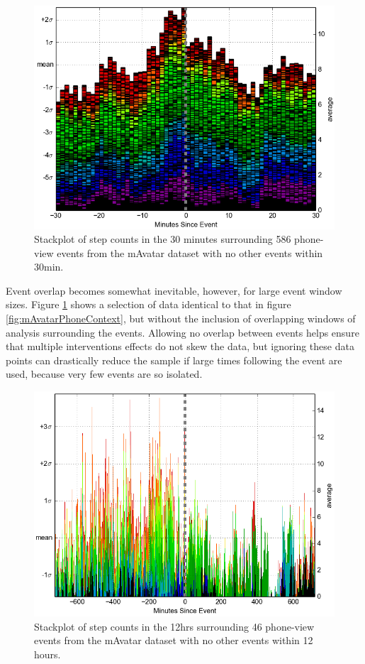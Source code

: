 \begin{figure}
\centering
\includegraphics[width=0.9\columnwidth]{./img/mAvatarViews_586_noOverlap.png}
\caption{Stackplot of step counts in the 30 minutes surrounding 586 phone-view events from the mAvatar dataset with no other events within 30min.}
\label{fig:mAvatarNoOverlap}
\end{figure}

Event overlap becomes somewhat inevitable, however, for large event window sizes.
Figure \ref{fig:mAvatarNoOverlap} shows a selection of data identical to that in figure \ref{fig:mAvatarPhoneContext}, but without the inclusion of overlapping windows of analysis surrounding the events.
Allowing no overlap between events helps ensure that multiple interventions effects do not skew the data, but ignoring these data points can drastically reduce the sample if large times following the event are used, because very few events are so isolated.

\begin{figure}
\centering
\includegraphics[width=0.9\columnwidth]{./img/mAvatarViews_46_12hr_noOverlap.png}
\caption{Stackplot of step counts in the 12hrs surrounding 46 phone-view events from the mAvatar dataset with no other events within 12 hours.}
\label{fig:mAvatarNoOverlap12hr}
\end{figure}

